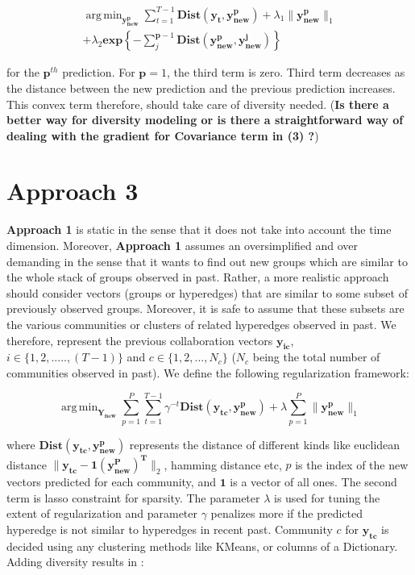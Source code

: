 \documentclass{sig-alternate}
\DeclareMathOperator*{\argmin}{arg\,min}
\begin{document}
\begin{multline}
\argmin_{\mathbf{y_{new}^{p}}}   \sum_{t=1}^{T-1} \mathbf{Dist(y_t,y_{new}^{p})} + \lambda_1 \| \mathbf{y_{new}^{p}} \|_{1} \\ + \lambda_2 \mathbf{exp} \left\{ - \sum_{j}^{\mathbf{p}-1} \mathbf{Dist(y_{new}^{p},y_{new}^{j})} \right\}
\end{multline}


for the $\mathbf{p}^{th}$ prediction. For $\mathbf{p}=1$, the third term is zero. Third term decreases as the distance between the new prediction and the previous prediction increases. This convex term therefore, should take care of diversity needed. (\textbf{Is there a better way for diversity modeling or is there a straightforward way of dealing with the gradient for Covariance term in (3) ?})

\section{Approach 3}

\textbf{Approach 1} is static in the sense that it does not take into account the time dimension. Moreover, \textbf{Approach 1} assumes an oversimplified and over demanding in the sense that it wants to find out new groups which are similar to the whole stack of groups observed in past. Rather, a more realistic approach should consider vectors (groups or hyperedges) that are similar to some subset of previously observed groups. Moreover, it is safe to assume that these subsets are the various communities or clusters of related hyperedges observed in past. We therefore, represent the previous collaboration vectors $\mathbf{y_{ic}}$, $i \in \{1,2,.....,(T-1)\}$ and $c \in \{1,2,...,N_c\}$ ($N_c$ being the total number of communities observed in past). We define the following regularization framework:

\begin{equation}
\argmin_{\mathbf{Y_{new}}}  \sum_{p=1}^{P} \sum_{t=1}^{T-1} \gamma^{-t} \mathbf{Dist(y_{tc},y_{new}^{p})} + \lambda  \sum_{p=1}^{P} \| \mathbf{y_{new}^{p}} \|_{1}
\end{equation}

where $\mathbf{Dist(y_{tc},y_{new}^{p})}$ represents the distance of different kinds like euclidean distance $\| \mathbf{y_{tc}}-\mathbf{1(y_{new}^{P})^T} \|_2$, hamming distance etc, $p$ is the index of the new vectors predicted for each community, and $\mathbf{1}$ is a vector of all ones. The second term is lasso constraint for sparsity. The parameter $\lambda$ is used for tuning the extent of regularization and parameter $\gamma$ penalizes more if the predicted hyperedge is not similar to hyperedges in recent past. Community $c$ for $\mathbf{y_{tc}}$ is decided using any clustering methods like KMeans, or columns of a Dictionary. Adding diversity results in :
\end{document}
